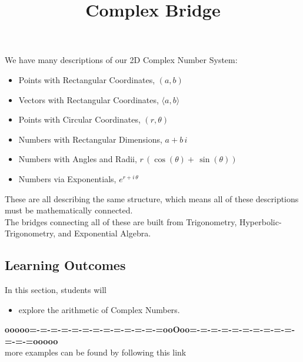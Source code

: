 \documentclass{ximera}
\title{Complex Bridge}
\begin{document}
\begin{abstract}
\end{abstract}
\maketitle




We have many descriptions of our 2D Complex Number System:

\begin{itemize}
\item Points with Rectangular Coordinates, $(a,b)$
\item Vectors with Rectangular Coordinates, $\langle a, b \rangle$
\item Points with Circular Coordinates, $(r,\theta)$
\item Numbers with Rectangular Dimensions, $a + b \, i$
\item Numbers with Angles and Radii, $r \, (\cos(\theta) + \, \sin(\theta))$
\item Numbers via Exponentials, $e^{r + i \, \theta}$
\end{itemize}

These are all describing the same structure, which means all of these descriptions must be mathematically connected. \\


The bridges connecting all of these are built from Trigonometry, Hyperbolic-Trigonometry, and Exponential Algebra.





\subsection{Learning Outcomes}

\begin{sectionOutcomes}
In this section, students will 

\begin{itemize}
\item explore the arithmetic of Complex Numbers.
\end{itemize}
\end{sectionOutcomes}













\begin{center}
\textbf{\textcolor{green!50!black}{ooooo=-=-=-=-=-=-=-=-=-=-=-=-=ooOoo=-=-=-=-=-=-=-=-=-=-=-=-=ooooo}} \\

more examples can be found by following this link\\ 

\end{center}
\end{document}
